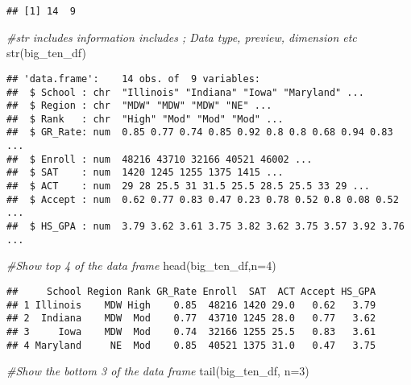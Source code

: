\documentclass[
]{article}
\newenvironment{Shaded}{\begin{snugshade}}{\end{snugshade}}
\newcommand{\AttributeTok}[1]{\textcolor[rgb]{0.77,0.63,0.00}{#1}}
\newcommand{\CommentTok}[1]{\textcolor[rgb]{0.56,0.35,0.01}{\textit{#1}}}
\newcommand{\DecValTok}[1]{\textcolor[rgb]{0.00,0.00,0.81}{#1}}
\newcommand{\FunctionTok}[1]{\textcolor[rgb]{0.00,0.00,0.00}{#1}}
\newcommand{\NormalTok}[1]{#1}
\begin{document}
\begin{verbatim}
## [1] 14  9
\end{verbatim}

\begin{Shaded}
\begin{Highlighting}[]
\CommentTok{\#str includes information includes ; Data type, preview, dimension etc }
\FunctionTok{str}\NormalTok{(big\_ten\_df)}
\end{Highlighting}
\end{Shaded}

\begin{verbatim}
## 'data.frame':    14 obs. of  9 variables:
##  $ School : chr  "Illinois" "Indiana" "Iowa" "Maryland" ...
##  $ Region : chr  "MDW" "MDW" "MDW" "NE" ...
##  $ Rank   : chr  "High" "Mod" "Mod" "Mod" ...
##  $ GR_Rate: num  0.85 0.77 0.74 0.85 0.92 0.8 0.8 0.68 0.94 0.83 ...
##  $ Enroll : num  48216 43710 32166 40521 46002 ...
##  $ SAT    : num  1420 1245 1255 1375 1415 ...
##  $ ACT    : num  29 28 25.5 31 31.5 25.5 28.5 25.5 33 29 ...
##  $ Accept : num  0.62 0.77 0.83 0.47 0.23 0.78 0.52 0.8 0.08 0.52 ...
##  $ HS_GPA : num  3.79 3.62 3.61 3.75 3.82 3.62 3.75 3.57 3.92 3.76 ...
\end{verbatim}

\begin{Shaded}
\begin{Highlighting}[]
\CommentTok{\#Show top 4 of the data frame }
\FunctionTok{head}\NormalTok{(big\_ten\_df,}\AttributeTok{n=}\DecValTok{4}\NormalTok{)}
\end{Highlighting}
\end{Shaded}

\begin{verbatim}
##     School Region Rank GR_Rate Enroll  SAT  ACT Accept HS_GPA
## 1 Illinois    MDW High    0.85  48216 1420 29.0   0.62   3.79
## 2  Indiana    MDW  Mod    0.77  43710 1245 28.0   0.77   3.62
## 3     Iowa    MDW  Mod    0.74  32166 1255 25.5   0.83   3.61
## 4 Maryland     NE  Mod    0.85  40521 1375 31.0   0.47   3.75
\end{verbatim}

\begin{Shaded}
\begin{Highlighting}[]
\CommentTok{\#Show the bottom 3 of the data frame }
\FunctionTok{tail}\NormalTok{(big\_ten\_df, }\AttributeTok{n=}\DecValTok{3}\NormalTok{)}
\end{Highlighting}
\end{Shaded}
\end{document}
